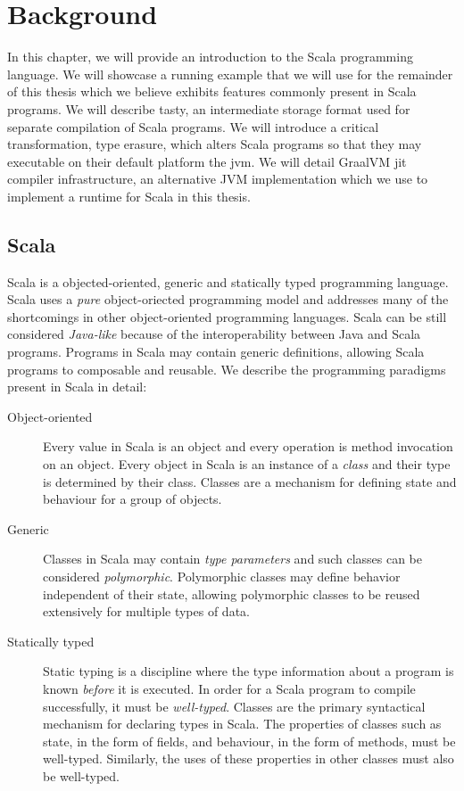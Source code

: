 \chapter{Background}

In this chapter, we will provide an introduction to the Scala programming language. 
We will showcase a running example that we will use for the remainder of this thesis which we believe exhibits features commonly present in Scala programs. 
We will describe \acrfull{tasty}, an intermediate storage format used for separate compilation\cite{???} of Scala programs. 
We will introduce a critical transformation, type erasure, which alters Scala programs so that they may executable on their default platform the \acrfull{jvm}. 
We will detail GraalVM \acrfull{jit} compiler infrastructure, an alternative JVM implementation which we use to implement a runtime for Scala in this thesis.

\section{Scala}

Scala\cite{scala:overview} is a objected-oriented, generic and statically typed programming language.
Scala uses a \textit{pure} object-oriected programming model\cite{smalltalk:design} and addresses many of the shortcomings\cite{go4:design-patterns} in other object-oriented programming languages.
Scala can be still considered \textit{Java-like} because of the interoperability between Java and Scala programs.
Programs in Scala may contain generic definitions, allowing Scala programs to composable and reusable\cite{scala:origins}.
We describe the programming paradigms present in Scala in detail:

\begin{description}
	\item[Object-oriented] 
	Every value in Scala is an object and every operation is method invocation on an object. 
	Every object in Scala is an instance of a \textit{class} and their type is determined by their class.
	Classes\cite{simula:classes} are a mechanism for defining state and behaviour for a group of objects.	
	
	\item[Generic] 
	Classes in Scala may contain \textit{type parameters} and such classes can be considered \textit{polymorphic}\cite{strachey:fundamental-concepts}.
	Polymorphic classes may define behavior independent of their state, allowing polymorphic classes to be reused extensively for multiple types of data.
	
	\item[Statically typed] 
	Static typing is a discipline where the type information about a program is known \textit{before} it is executed.
	In order for a Scala program to compile successfully, it must be \textit{well-typed}.
	Classes are the primary syntactical mechanism for declaring types in Scala. 
	The properties of classes such as state, in the form of fields, and behaviour, in the form of methods, must be well-typed.
	Similarly, the uses of these properties in other classes must also be well-typed. 
\end{description}

